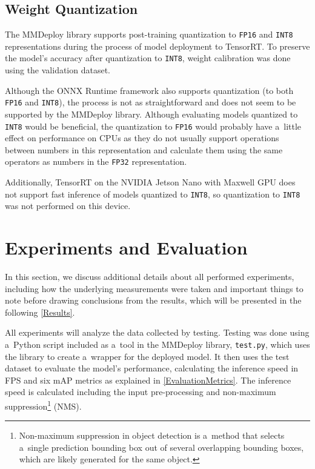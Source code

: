 \subsection*{Weight Quantization}

The MMDeploy library supports post-training quantization to \texttt{FP16} and
\texttt{INT8} representations during the process of model deployment to
TensorRT. To preserve the model's accuracy after quantization to \texttt{INT8},
weight calibration was done using the validation dataset.

Although the ONNX Runtime framework also supports quantization (to both
\texttt{FP16} and \texttt{INT8}), the process is not as straightforward and
does not seem to be supported by the MMDeploy library. Although evaluating models
quantized to \texttt{INT8} would be beneficial, the quantization to
\texttt{FP16} would probably have a~little effect on performance on CPUs as they
do not usually support operations between numbers in this representation and
calculate them using the same operators as numbers in the \texttt{FP32}
representation.

Additionally, TensorRT on the NVIDIA Jetson Nano with Maxwell GPU does not
support fast inference of models quantized to \texttt{INT8}, so quantization to
\texttt{INT8} was not performed on this device.


\section{Experiments and Evaluation}

In this section, we discuss additional details about all performed experiments,
including how the underlying measurements were taken and important things to
note before drawing conclusions from the results, which will be presented in
the following \autoref{Results}.

All experiments will analyze the data collected by testing. Testing was done using
a~Python script included as a~tool in the MMDeploy library, \texttt{test.py},
which uses the library to create a~wrapper for the deployed model. It then uses
the test dataset to evaluate the model's performance, calculating the
inference speed in FPS and six mAP metrics as explained in
\autoref{EvaluationMetrics}. The inference speed is calculated including the
input pre-processing and non-maximum suppression\footnote{Non-maximum
suppression in object detection is a~method that selects a~single prediction
bounding box out of several overlapping bounding boxes, which are likely
generated for the same object.} (NMS).

